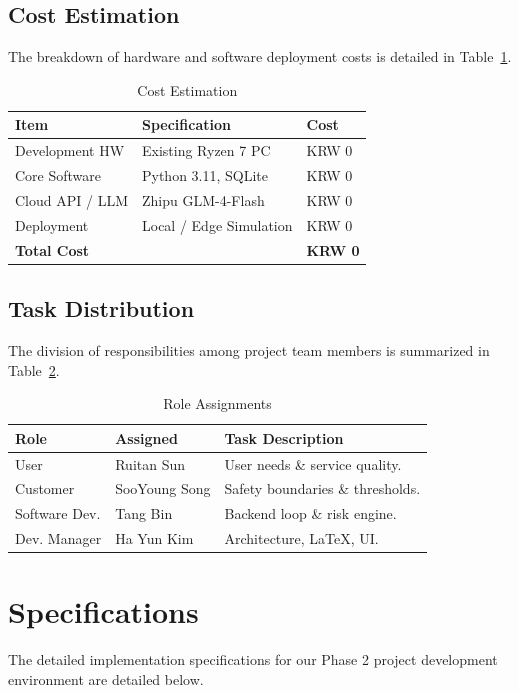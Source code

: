\documentclass[conference]{IEEEtran}
\begin{document}
\subsection{Cost Estimation}
The breakdown of hardware and software deployment costs is detailed in Table~\ref{tab:cost}.

\begin{table}[htbp]
\caption{Cost Estimation}
\label{tab:cost}
\centering
\begin{tabular}{p{2.3cm}p{3.8cm}l}
\toprule
\textbf{Item} & \textbf{Specification} & \textbf{Cost} \\
\midrule
Development HW & Existing Ryzen 7 PC & KRW 0 \\
Core Software & Python 3.11, SQLite & KRW 0 \\
Cloud API / LLM & Zhipu GLM-4-Flash & KRW 0 \\
Deployment & Local / Edge Simulation & KRW 0 \\
\midrule
\textbf{Total Cost} & & \textbf{KRW 0} \\
\bottomrule
\end{tabular}
\end{table}

\subsection{Task Distribution}
The division of responsibilities among project team members is summarized in Table~\ref{tab:roles}.

\begin{table}[htbp]
\caption{Role Assignments}
\label{tab:roles}
\centering
\begin{tabular}{llp{3.6cm}}
\toprule
\textbf{Role} & \textbf{Assigned} & \textbf{Task Description} \\
\midrule
User & Ruitan Sun & User needs \& service quality. \\
\hline
Customer & SooYoung Song & Safety boundaries \& thresholds. \\
\hline
Software Dev. & Tang Bin & Backend loop \& risk engine. \\
\hline
Dev. Manager & Ha Yun Kim & Architecture, LaTeX, UI. \\
\bottomrule
\end{tabular}
\end{table}

\section{Specifications}
The detailed implementation specifications for our Phase 2 project development environment are detailed below.
\end{document}
